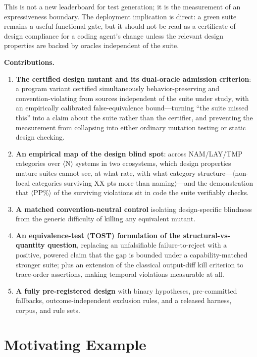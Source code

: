 \documentclass[conference]{IEEEtran}
\newcommand{\ph}[1]{\colorbox{yellow!35}{\small$\langle$\textsf{#1}$\rangle$}}
\begin{document}
This is not a new leaderboard for test generation; it is the measurement of an expressiveness boundary. The deployment implication is direct: a green suite remains a useful functional gate, but it should not be read as a certificate of design compliance for a coding agent's change unless the relevant design properties are backed by oracles independent of the suite.

\textbf{Contributions.}
\begin{enumerate}[leftmargin=1.4em]
\item \textbf{The certified design mutant and its dual-oracle admission criterion}: a program variant certified simultaneously behavior-preserving and convention-violating from sources independent of the suite under study, with an empirically calibrated false-equivalence bound---turning ``the suite missed this'' into a claim about the suite rather than the certifier, and preventing the measurement from collapsing into either ordinary mutation testing or static design checking.
\item \textbf{An empirical map of the design blind spot}: across NAM/LAY/TMP categories over \ph{N} systems in two ecosystems, which design properties mature suites cannot see, at what rate, with what category structure---\ph{non-local categories surviving XX pts more than naming}---and the demonstration that \ph{PP\%} of the surviving violations sit in code the suite verifiably checks.
\item \textbf{A matched convention-neutral control} isolating design-specific blindness from the generic difficulty of killing any equivalent mutant.
\item \textbf{An equivalence-test (TOST) formulation of the structural-vs-quantity question}, replacing an unfalsifiable failure-to-reject with a positive, powered claim that the gap is bounded under a capability-matched stronger suite; plus an extension of the classical output-diff kill criterion to trace-order assertions, making temporal violations measurable at all.
\item \textbf{A fully pre-registered design} with binary hypotheses, pre-committed fallbacks, outcome-independent exclusion rules, and a released harness, corpus, and rule sets.
\end{enumerate}

\section{Motivating Example}\label{sec:motivation}
\end{document}
